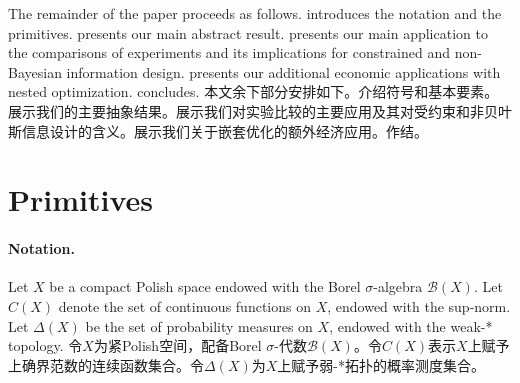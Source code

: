 \documentclass[12pt,letterpaper]{article}
\newenvironment{original}{\color{black}}{}
\newenvironment{translation}{\color{blue}}{}
\theoremstyle{plain}
\theoremstyle{definition}
\theoremstyle{remark}
\theoremstyle{definition}
\begin{document}
\begin{original}
The remainder of the paper proceeds as follows.  introduces the notation and the primitives.   presents our main abstract result.  presents our main application to the comparisons of experiments and its implications for constrained and non-Bayesian information design.  presents our additional economic applications with nested optimization.  concludes.
\end{original}
\begin{translation}
本文余下部分安排如下。介绍符号和基本要素。展示我们的主要抽象结果。展示我们对实验比较的主要应用及其对受约束和非贝叶斯信息设计的含义。展示我们关于嵌套优化的额外经济应用。作结。
\end{translation}

\section{Primitives}\label{sec:model}

\paragraph{Notation.}\hspace{-2mm}
\begin{original}
Let $X$ be a compact Polish space endowed with the Borel $\sigma$-algebra $\mathcal{B}(X)$. Let $C(X)$ denote the set of continuous functions on $X$, endowed with the sup-norm. Let $\Delta(X)$ be the set of probability measures on $X$, endowed with the weak-* topology.
\end{original}
\begin{translation}
令$X$为紧Polish空间，配备Borel $\sigma$-代数$\mathcal{B}(X)$。令$C(X)$表示$X$上赋予上确界范数的连续函数集合。令$\Delta(X)$为$X$上赋予弱-*拓扑的概率测度集合。
\end{translation}
\end{document}
